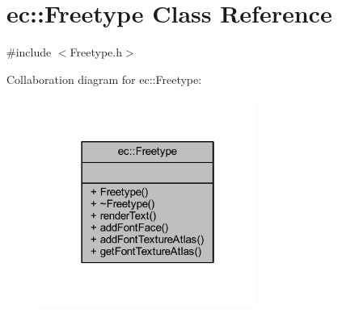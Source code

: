 \hypertarget{classec_1_1_freetype}{}\section{ec\+:\+:Freetype Class Reference}
\label{classec_1_1_freetype}


{\ttfamily \#include $<$Freetype.\+h$>$}



Collaboration diagram for ec\+:\+:Freetype\+:\nopagebreak
\begin{figure}[H]
\begin{center}
\leavevmode
\includegraphics[width=202pt]{classec_1_1_freetype__coll__graph}
\end{center}
\end{figure}
